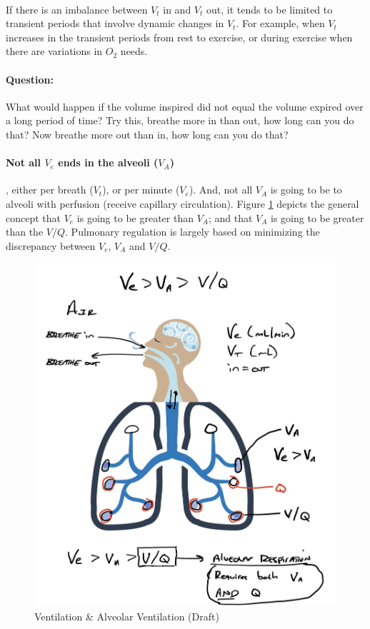 \paragraph{} If there is an imbalance between $V_t$ in and $V_t$ out, it tends to be limited to transient periods that involve dynamic changes in $V_t$. For example, when $V_t$ increases in the transient periods from rest to exercise, or during exercise when there are variations in $O_2$ needs.

\paragraph{Question:} What would happen if the volume inspired did not equal the volume expired over a long period of time? Try this, breathe more in than out, how long can you do that? Now breathe more out than in, how long can you do that?

\paragraph{Not all $V_e$ ends in the alveoli ($V_A$)}, either per breath ($V_t$), or per minute ($V_e$). And, not all $V_A$ is going to be to alveoli with perfusion (receive capillary circulation). Figure \ref{fig:ve_va.jpg} depicts the general concept that $V_e$ is going to be greater than $V_A$; and that $V_A$ is going to be greater than the $V/Q$. Pulmonary regulation is largely based on minimizing the discrepancy between $V_e$, $V_A$ and $V/Q$.

\begin{figure}
    \centering
    \includegraphics[width = 0.5\linewidth]{./figure/ventilation/ve_va.jpg}
    \caption{Ventilation \& Alveolar Ventilation (Draft)}
    \label{fig:ve_va.jpg}
\end{figure}

